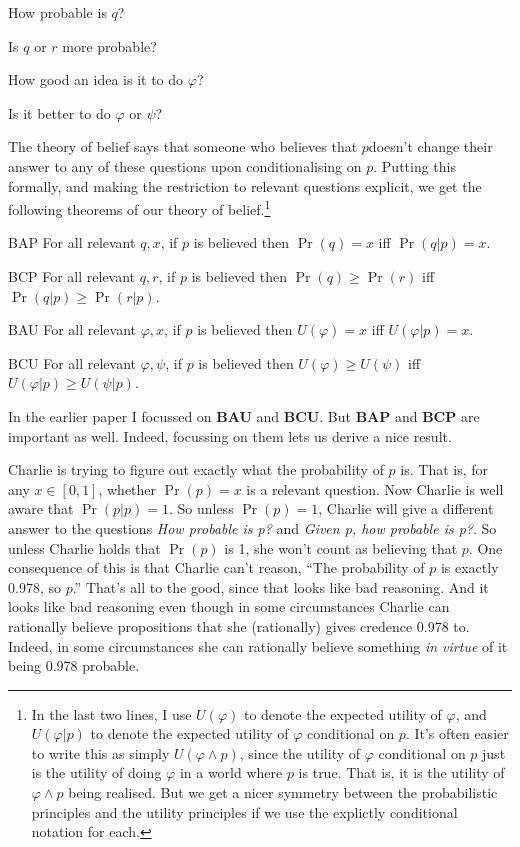 \begin{itemize*}
\item How probable is $q$?
\item Is $q$ or $r$ more probable?
\item How good an idea is it to do $\varphi$?
\item Is it better to do $\varphi$ or $\psi$?
\end{itemize*}

\noindent The theory of belief says that someone who believes that $p$doesn't change their answer to any of these questions upon conditionalising on $p$. Putting this formally, and making the restriction to relevant questions explicit, we get the following theorems of our theory of belief.\footnote{In the last two lines, I use $U(\varphi)$ to denote the expected utility of $\varphi$, and $U(\varphi | p)$ to denote the expected utility of $\varphi$ conditional on $p$. It's often easier to write this as simply $U(\varphi \wedge p)$, since the utility of $\varphi$ conditional on $p$ just is the utility of doing $\varphi$ in a world where $p$ is true. That is, it is the utility of $\varphi \wedge p$ being realised. But we get a nicer symmetry between the probabilistic principles and the utility principles if we use the explictly conditional notation for each.}

\begin{description*}
\item[BAP] For all relevant $q, x$, if $p$ is believed then $\Pr(q) = x$ iff $\Pr(q | p) = x$.
\item[BCP] For all relevant $q, r$, if $p$ is believed then $\Pr(q) \geq \Pr(r)$ iff $\Pr(q | p) \geq \Pr(r | p)$.
\item[BAU] For all relevant $\varphi, x$, if $p$ is believed then $U(\varphi) = x$ iff $U(\varphi | p) = x$.
\item[BCU] For all relevant $\varphi, \psi$, if $p$ is believed then $U(\varphi) \geq U(\psi)$ iff $U(\varphi | p) \geq U(\psi | p)$.
\end{description*}

\noindent In the earlier paper I focussed on \textbf{BAU} and \textbf{BCU}. But \textbf{BAP} and \textbf{BCP} are important as well. Indeed, focussing on them lets us derive a nice result. 

Charlie is trying to figure out exactly what the probability of $p$ is. That is, for any $x \in [0, 1]$, whether $\Pr(p) = x$ is a relevant question. Now Charlie is well aware that $\Pr(p | p) = 1$. So unless $\Pr(p) = 1$, Charlie will give a different answer to the questions \textit{How probable is p?} and \textit{Given p, how probable is p?}. So unless Charlie holds that $\Pr(p)$ is 1, she won't count as believing that $p$. One consequence of this is that Charlie can't reason, ``The probability of $p$ is exactly 0.978, so $p$.'' That's all to the good, since that looks like bad reasoning. And it looks like bad reasoning even though in some circumstances Charlie can rationally believe propositions that she (rationally) gives credence 0.978 to. Indeed, in some circumstances she can rationally believe something \textit{in virtue} of it being 0.978 probable.

